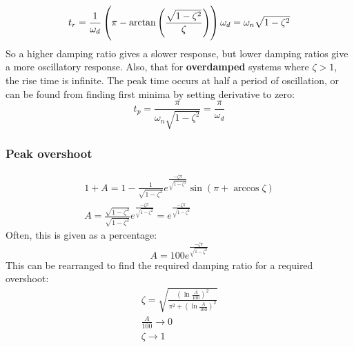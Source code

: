 \documentclass[class=report, crop=false, 12pt,a4paper]{standalone}
\begin{document}
\begin{equation}
  t_r = \frac{1}{\omega_d} \left( \pi - \arctan{\left( \frac{\sqrt{1-\zeta^2}}{\zeta} \right)} \right)\\
  \omega_d = \omega_n \sqrt{1-\zeta^2}
\end{equation}
So a higher damping ratio gives a slower response, but lower damping ratios give a more oscillatory response. Also, that for \textbf{overdamped} systems where $\zeta > 1$, the rise time is infinite. The peak time occurs at half a period of oscillation, or can be found from finding first minima by setting derivative to zero:
\begin{equation}
  t_p = \frac{\pi}{\omega_n\sqrt{1 - \zeta^2}} = \frac{\pi}{\omega_d}
\end{equation}
\subsubsection{Peak overshoot}
\begin{gather}
  1 + A = 1 - \frac{1}{\sqrt{1 - \zeta^2}} e^{\frac{-\zeta \pi}{\sqrt{1-\zeta^2}}}\sin{\left(\pi + \arccos{\zeta}\right)}\\[10pt]
  A = \frac{\sqrt{1-\zeta^2}}{\sqrt{1-\zeta^2}} e^{\frac{-\zeta \pi}{\sqrt{1-\zeta^2}}} = e^{\frac{-\zeta \pi}{\sqrt{1-\zeta^2}}}
\end{gather}
Often, this is given as a percentage:
\begin{equation}
  A = 100 e^{\frac{-\zeta \pi}{\sqrt{1-\zeta^2}}}
\end{equation}
This can be rearranged to find the required damping ratio for a required overshoot:
\begin{gather}
  \zeta = \sqrt{\frac{\left(\ln{\frac{A}{100}}\right)^2}{\pi^2 + \left(\ln{\frac{A}{100}}\right)^2}}\\
  \frac{A}{100} \rightarrow 0\\
  \zeta \rightarrow 1
\end{gather}
\end{document}
